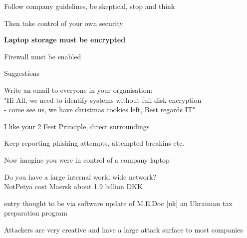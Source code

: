 \documentclass[Screen16to9,17pt,footrule]{foils}
\begin{document}
\begin{list1}
\item Follow company guidelines, be skeptical, stop and think
\item Then take control of your own security
\item {\bf Laptop storage must be encrypted}
\item Firewall must be enabled
\item Suggestions
\begin{list2}
\item Write an email to everyone in your organisation:\\
"Hi All, we need to identify systems without full disk encryption \\
- come see us, we have christmas cookies left, Best regards IT"
\end{list2}
\vskip 5mm
\item I like your 2 Feet Principle, direct surroundings
\item Keep reporting phishing attempts, attempted breakins etc.
\end{list1}




\begin{list2}
\item Now imagine you were in control of a company laptop
\item Do you have a large internal world wide network?\\
NotPetya cost Maersk about 1.9 billion DKK

\item entry thought to be via software update of M.E.Doc [uk] an Ukrainian tax preparation program
\item Attackers are very creative and have a large attack surface to most companies
\end{list2}



\end{document}
